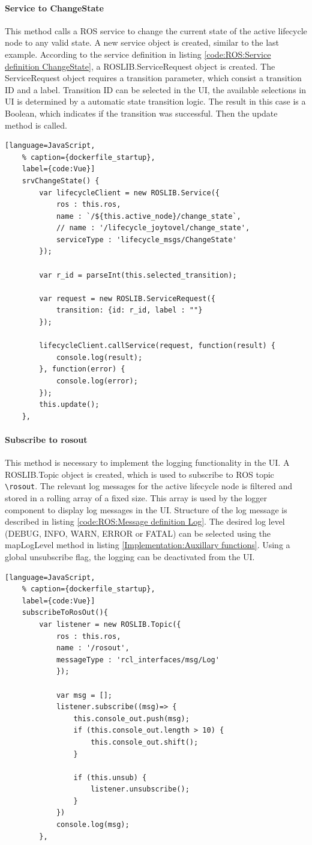 \paragraph{Service to ChangeState} This method calls a ROS service to change the current state of the active lifecycle node to any valid state. A new service object is created, similar to the last example. According to the service definition in listing \ref{code:ROS:Service definition ChangeState}, a ROSLIB.ServiceRequest object is created. The ServiceRequest object requires a transition parameter, which consist a transition ID and a label. Transition ID can be selected in the UI, the available selections in UI is determined by a automatic state transition logic. The result in this case is a Boolean, which indicates if the transition was successful. Then the update method is called.
\begin{lstlisting}[language=JavaScript,
	% caption={dockerfile_startup}, 
	label={code:Vue}]
	srvChangeState() {
		var lifecycleClient = new ROSLIB.Service({
			ros : this.ros,
			name : `/${this.active_node}/change_state`,
			// name : '/lifecycle_joytovel/change_state', 
			serviceType : 'lifecycle_msgs/ChangeState'
		});
	
		var r_id = parseInt(this.selected_transition);

		var request = new ROSLIB.ServiceRequest({
			transition: {id: r_id, label : ""}
		});

		lifecycleClient.callService(request, function(result) {
			console.log(result);
		}, function(error) {
			console.log(error);
		});
		this.update();
	},
\end{lstlisting}

\paragraph{Subscribe to rosout} This method is necessary to implement the logging functionality in the UI. A ROSLIB.Topic object is created, which is used to subscribe to ROS topic \lstinline{\rosout}. The relevant log messages for the active lifecycle node is filtered and stored in a rolling array of a fixed size. This array is used by the logger component to display log messages in the UI. Structure of the log message is described in listing \ref{code:ROS:Message definition Log}. The desired log level (DEBUG, INFO, WARN, ERROR or FATAL) can be selected using the mapLogLevel method in listing \ref{Implementation:Auxillary functions}. Using a global unsubscribe flag, the logging can be deactivated from the UI. 
\begin{lstlisting}[language=JavaScript,
	% caption={dockerfile_startup}, 
	label={code:Vue}]
	subscribeToRosOut(){
		var listener = new ROSLIB.Topic({
			ros : this.ros,
			name : '/rosout',
			messageType : 'rcl_interfaces/msg/Log'
			});

			var msg = [];
			listener.subscribe((msg)=> {
				this.console_out.push(msg);
				if (this.console_out.length > 10) {
					this.console_out.shift();
				}
				
				if (this.unsub) {
					listener.unsubscribe();
				}
			}) 
			console.log(msg);
		},
\end{lstlisting}

